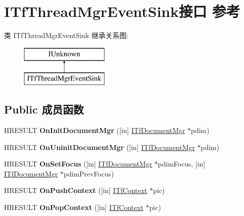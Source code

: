 \hypertarget{interface_i_tf_thread_mgr_event_sink}{}\section{I\+Tf\+Thread\+Mgr\+Event\+Sink接口 参考}
\label{interface_i_tf_thread_mgr_event_sink}
类 I\+Tf\+Thread\+Mgr\+Event\+Sink 继承关系图\+:\begin{figure}[H]
\begin{center}
\leavevmode
\includegraphics[height=2.000000cm]{interface_i_tf_thread_mgr_event_sink}
\end{center}
\end{figure}
\subsection*{Public 成员函数}
\begin{DoxyCompactItemize}
\item 
\mbox{\label{interface_i_tf_thread_mgr_event_sink_acf294b064c1fb87efbad8f4447cdd86f}} 
H\+R\+E\+S\+U\+LT {\bfseries On\+Init\+Document\+Mgr} (\mbox{[}in\mbox{]} \hyperlink{interface_i_tf_document_mgr}{I\+Tf\+Document\+Mgr} $\ast$pdim)
\item 
\mbox{\label{interface_i_tf_thread_mgr_event_sink_a25035586b1fc85731da197835b18cf66}} 
H\+R\+E\+S\+U\+LT {\bfseries On\+Uninit\+Document\+Mgr} (\mbox{[}in\mbox{]} \hyperlink{interface_i_tf_document_mgr}{I\+Tf\+Document\+Mgr} $\ast$pdim)
\item 
\mbox{\label{interface_i_tf_thread_mgr_event_sink_ac2d84eeadd291a82a37db2301856cbcf}} 
H\+R\+E\+S\+U\+LT {\bfseries On\+Set\+Focus} (\mbox{[}in\mbox{]} \hyperlink{interface_i_tf_document_mgr}{I\+Tf\+Document\+Mgr} $\ast$pdim\+Focus, \mbox{[}in\mbox{]} \hyperlink{interface_i_tf_document_mgr}{I\+Tf\+Document\+Mgr} $\ast$pdim\+Prev\+Focus)
\item 
\mbox{\label{interface_i_tf_thread_mgr_event_sink_ae5277536f83bc1b174c5f62e37672a8a}} 
H\+R\+E\+S\+U\+LT {\bfseries On\+Push\+Context} (\mbox{[}in\mbox{]} \hyperlink{interface_i_tf_context}{I\+Tf\+Context} $\ast$pic)
\item 
\mbox{\label{interface_i_tf_thread_mgr_event_sink_a8f3d9cbd89a84f4812fd3eec8f8bfa4b}} 
H\+R\+E\+S\+U\+LT {\bfseries On\+Pop\+Context} (\mbox{[}in\mbox{]} \hyperlink{interface_i_tf_context}{I\+Tf\+Context} $\ast$pic)
\end{DoxyCompactItemize}
